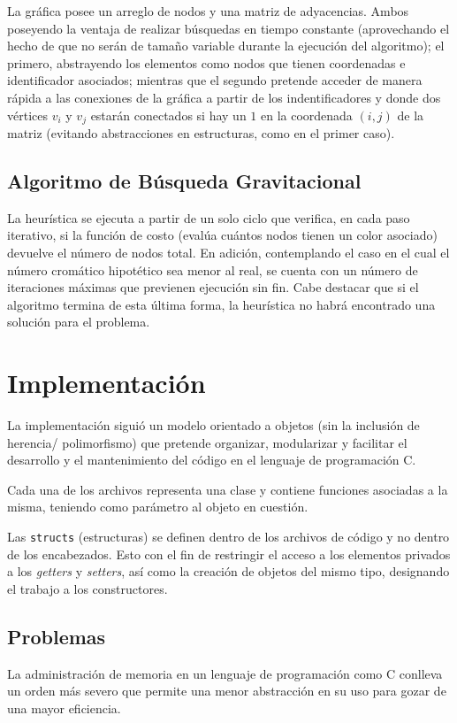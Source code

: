 \documentclass[a4paper]{report}
\begin{document}
La gr\'afica posee un arreglo de nodos y una matriz de adyacencias. Ambos poseyendo la ventaja de
realizar b\'usquedas en tiempo constante (aprovechando el hecho de que no ser\'an de tama\~no
variable durante la ejecuci\'on del algoritmo); el primero, abstrayendo los elementos como nodos
que tienen coordenadas e identificador asociados; mientras que el segundo pretende acceder de
manera r\'apida a las conexiones de la gr\'afica a partir de los indentificadores y donde dos
v\'ertices $v_i$ y $v_j$ estar\'an conectados si hay un $1$ en la coordenada $(i, j)$ de la matriz
(evitando abstracciones en estructuras, como en el primer caso).

\section{Algoritmo de B\'usqueda Gravitacional}

La heur\'istica se ejecuta a partir de un solo ciclo que verifica, en cada paso iterativo,
si la funci\'on de costo (eval\'ua cu\'antos nodos tienen un color asociado) devuelve
el n\'umero de nodos total. En adici\'on, contemplando el caso en el cual el n\'umero
crom\'atico hipot\'etico sea menor al real, se cuenta con un n\'umero de iteraciones
m\'aximas que previenen ejecuci\'on sin fin. Cabe destacar que si el algoritmo termina
de esta \'ultima forma, la heur\'istica no habr\'a encontrado una soluci\'on para el
problema.

\chapter{Implementaci\'on}
La implementaci\'on sigui\'o un modelo orientado a objetos (sin la inclusi\'on de herencia/
polimorfismo) que pretende organizar, modularizar y facilitar el desarrollo y el mantenimiento
del c\'odigo en el lenguaje de programaci\'on C.

Cada una de los archivos representa una clase y contiene funciones asociadas a la misma,
teniendo como par\'ametro al objeto en cuesti\'on.

Las \texttt{structs} (estructuras) se definen dentro de los archivos de c\'odigo y no dentro
de los encabezados. Esto con el fin de restringir el acceso a los elementos privados a los
\textit{getters} y \textit{setters}, as\'i como la creaci\'on de objetos del mismo tipo,
designando el trabajo a los constructores.

\section{Problemas}
La administraci\'on de memoria en un lenguaje de programaci\'on como C conlleva un orden m\'as
severo que permite una menor abstracci\'on en su uso para gozar de una mayor eficiencia.
\end{document}
